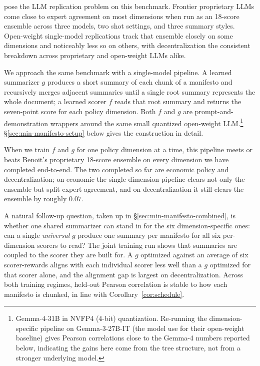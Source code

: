 \citet{BenoitEtAl2025} pose the LLM replication problem on this
benchmark. Frontier proprietary LLMs come close to expert agreement
on most dimensions when run as an 18-score ensemble across three
models, two shot settings, and three summary styles. Open-weight
single-model replications track that ensemble closely on some
dimensions and noticeably less so on others, with decentralization
the consistent breakdown across proprietary and open-weight LLMs
alike.

We approach the same benchmark with a single-model pipeline. A
learned summarizer $g$ produces a short summary of each chunk of a
manifesto and recursively merges adjacent summaries until a single
root summary represents the whole document; a learned scorer $f$
reads that root summary and returns the seven-point score for each
policy dimension. Both $f$ and $g$ are prompt-and-demonstration
wrappers around the same small quantized open-weight
LLM.\footnote{Gemma-4-31B in NVFP4 (4-bit) quantization.
Re-running the dimension-specific pipeline on Gemma-3-27B-IT (the
model \citet{BenoitEtAl2025} use for their open-weight baseline)
gives Pearson correlations close to the Gemma-4 numbers reported
below, indicating the gains here come from the tree structure, not
from a stronger underlying model.}
\S\ref{sec:min-manifesto-setup} below gives the construction in
detail.

When we train $f$ and $g$ for one policy dimension at a time, this
pipeline meets or beats Benoit's proprietary 18-score ensemble on
every dimension we have completed end-to-end. The two completed so
far are economic policy and decentralization; on economic the
single-dimension pipeline clears not only the ensemble but
split-expert agreement, and on decentralization it still clears
the ensemble by roughly $0.07$.

A natural follow-up question, taken up in
\S\ref{sec:min-manifesto-combined}, is whether one shared
summarizer can stand in for the six dimension-specific ones: can a
single \emph{universal} $g$ produce one summary per manifesto for
all six per-dimension scorers to read? The joint training run shows
that summaries are coupled to the scorer they are built for. A $g$
optimized against an average of six scorer-rewards aligns with each
individual scorer less well than a $g$ optimized for that scorer
alone, and the alignment gap is largest on decentralization. Across
both training regimes, held-out Pearson correlation is stable to how each
manifesto is chunked, in line with Corollary~\ref{cor:schedule}.

